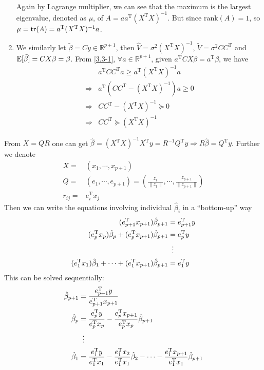 \begin{sol}
\begin{enumerate}
\begin{align*}
\end{align*}
Again by Lagrange multiplier, we can see that the maximum is the largest eigenvalue, denoted as $\mu$, of $A=aa^{\mathrm{T}}(X^{\mathrm{T}}X)^{-1}$. But since $\mathrm{rank}(A)=1$, so $\mu=\operatorname{tr}(A)=a^{\mathrm{T}}(X^{\mathrm{T}}X)^{-1}a$.
\item We similarly let $\tilde{\beta}=Cy\in\mathbb{R}^{p+1}$, then $\hat{V}=\sigma^2(X^\mathrm{T}X)^{-1}$, $\tilde{V}=\sigma^2CC^{\mathrm{T}}$ and $\operatorname{E}[\tilde{\beta}]=CX\beta=\beta$. From \ref{3.3-1}, $\forall a\in\mathbb{R}^{p+1}$, given $a^{\mathrm{T}}CX\beta=a^{\mathrm{T}}\beta$, we have
\begin{align*}
& a^{\mathrm{T}}CC^{\mathrm{T}}a\ge a^{\mathrm{T}}(X^\mathrm{T}X)^{-1}a\\
\Longrightarrow & a^{\mathrm{T}}\left(CC^{\mathrm{T}}-(X^\mathrm{T}X)^{-1}\right)a\ge 0\\
\Longrightarrow & CC^{\mathrm{T}} - \left(X^\mathrm{T}X\right)^{-1} \succeq 0\\
\Longrightarrow & CC^{\mathrm{T}}\succeq \left(X^\mathrm{T}X\right)^{-1}
\end{align*}
\end{enumerate}
\end{sol}

\begin{sol}
From $X=QR$ one can get $\hat{\beta}=(X^\mathrm{T}X)^{-1}X^\mathrm{T}y=R^{-1}Q^\mathrm{T}y\Longrightarrow R\hat{\beta}=Q^\mathrm{T}y$. Further we denote
\begin{align*}
X =& (x_1,\cdots,x_{p+1})\\
Q =& (e_1,\cdots,e_{p+1})=(\frac{z_1}{\|z_1\|},\cdots,\frac{z_{p+1}}{\|z_{p+1}\|})\\
r_{ij} =& e_i^\mathrm{T}x_j
\end{align*}
Then we can write the equations involving individual $\hat{\beta}_i$ in a ``bottom-up'' way
\begin{align*}
(e_{p+1}^\mathrm{T}x_{p+1})\hat{\beta}_{p+1} &= e_{p+1}^\mathrm{T}y\\
(e_{p}^\mathrm{T}x_{p})\hat{\beta}_{p} + (e_{p}^\mathrm{T}x_{p+1})\hat{\beta}_{p+1} &= e_{p}^\mathrm{T}y\\
&\vdotswithin{=}\\
(e_{1}^\mathrm{T}x_{1})\hat{\beta}_{1} + \cdots + (e_{1}^\mathrm{T}x_{p+1})\hat{\beta}_{p+1} &= e_{1}^\mathrm{T}y
\end{align*}
This can be solved sequentially:
\begin{align*}
\hat{\beta}_{p+1} &= \frac{e_{p+1}^\mathrm{T}y}{e_{p+1}^\mathrm{T}x_{p+1}}\\
\hat{\beta}_{p} &= \frac{e_{p}^\mathrm{T}y}{e_{p}^\mathrm{T}x_{p}}-\frac{e_{p}^\mathrm{T}x_{p+1}}{e_{p}^\mathrm{T}x_{p}}\hat{\beta}_{p+1}\\
&\vdotswithin{=}\\
\hat{\beta}_{1} &= \frac{e_{1}^\mathrm{T}y}{e_{1}^\mathrm{T}x_{1}}- \frac{e_{1}^\mathrm{T}x_{2}}{e_{1}^\mathrm{T}x_{1}}\hat{\beta}_{2} - \cdots - \frac{e_{1}^\mathrm{T}x_{p+1}}{e_{1}^\mathrm{T}x_{1}}\hat{\beta}_{p+1}
\end{align*}
\end{sol}

